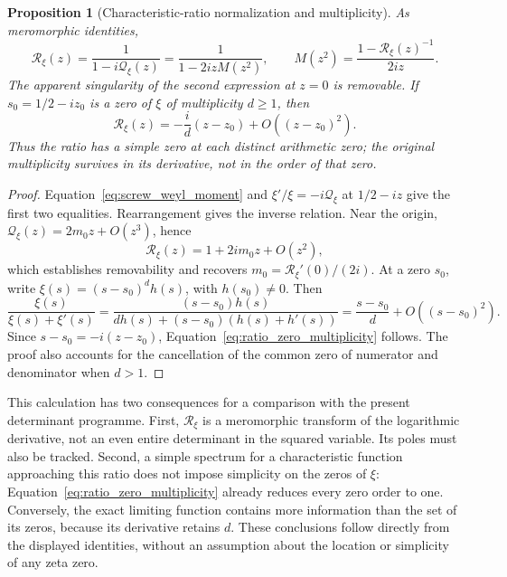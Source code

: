 \documentclass[11pt,letterpaper]{article}
\numberwithin{equation}{section}
\newtheorem{proposition}[theorem]{Proposition}
\theoremstyle{definition}
\theoremstyle{remark}
\begin{document}
\begin{proposition}[Characteristic-ratio normalization and multiplicity]
\label{prop:ratio_moment}
As meromorphic identities,
\begin{equation}
 \mathcal R_\xi(z)=\frac1{1-i\mathcal Q_\xi(z)}
 =\frac1{1-2izM(z^2)},
 \qquad
 M(z^2)=\frac{1-\mathcal R_\xi(z)^{-1}}{2iz}.
 \label{eq:ratio_moment_identity}
\end{equation}
The apparent singularity of the second expression at $z=0$ is removable. If $s_0=1/2-iz_0$ is a zero of $\xi$ of multiplicity $d\geq1$, then
\begin{equation}
 \mathcal R_\xi(z)=-\frac{i}{d}(z-z_0)+O((z-z_0)^2).
 \label{eq:ratio_zero_multiplicity}
\end{equation}
Thus the ratio has a simple zero at each distinct arithmetic zero; the original multiplicity survives in its derivative, not in the order of that zero.
\end{proposition}
\begin{proof}
Equation~\eqref{eq:screw_weyl_moment} and $\xi'/\xi=-i\mathcal Q_\xi$ at $1/2-iz$ give the first two equalities. Rearrangement gives the inverse relation. Near the origin, $\mathcal Q_\xi(z)=2m_0z+O(z^3)$, hence
\[
 \mathcal R_\xi(z)=1+2im_0z+O(z^2),
\]
which establishes removability and recovers $m_0=\mathcal R_\xi'(0)/(2i)$. At a zero $s_0$, write $\xi(s)=(s-s_0)^d h(s)$, with $h(s_0)\neq0$. Then
\[
 \frac{\xi(s)}{\xi(s)+\xi'(s)}
 =\frac{(s-s_0)h(s)}{d h(s)+(s-s_0)(h(s)+h'(s))}
 =\frac{s-s_0}{d}+O((s-s_0)^2).
\]
Since $s-s_0=-i(z-z_0)$, Equation~\eqref{eq:ratio_zero_multiplicity} follows. The proof also accounts for the cancellation of the common zero of numerator and denominator when $d>1$.
\end{proof}

This calculation has two consequences for a comparison with the present determinant programme. First, $\mathcal R_\xi$ is a meromorphic transform of the logarithmic derivative, not an even entire determinant in the squared variable. Its poles must also be tracked. Second, a simple spectrum for a characteristic function approaching this ratio does not impose simplicity on the zeros of $\xi$: Equation~\eqref{eq:ratio_zero_multiplicity} already reduces every zero order to one. Conversely, the exact limiting function contains more information than the set of its zeros, because its derivative retains $d$. These conclusions follow directly from the displayed identities, without an assumption about the location or simplicity of any zeta zero.
\end{document}
